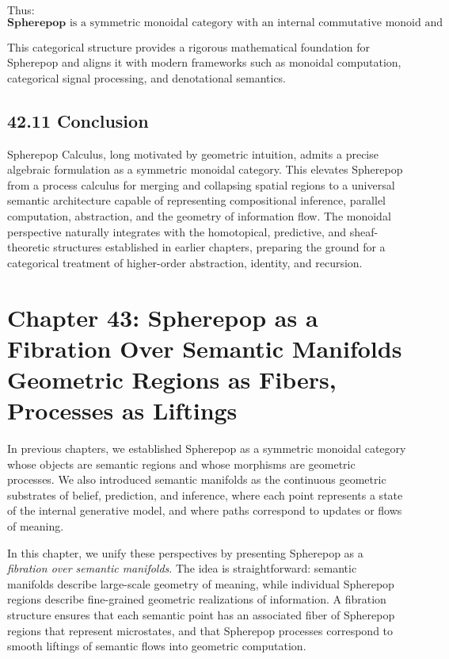 \documentclass[12pt,letterpaper]{article}
\theoremstyle{remark}
\begin{document}
Thus:
\[
\boxed{
\mathbf{Spherepop} \text{ is a symmetric monoidal category with an internal commutative monoid and collapse homomorphisms.}
}
\]

This categorical structure provides a rigorous mathematical foundation for Spherepop and aligns it with modern frameworks such as monoidal computation, categorical signal processing, and denotational semantics.

\subsection{42.11 Conclusion}

Spherepop Calculus, long motivated by geometric intuition, admits a precise algebraic formulation as a symmetric monoidal category. This elevates Spherepop from a process calculus for merging and collapsing spatial regions to a universal semantic architecture capable of representing compositional inference, parallel computation, abstraction, and the geometry of information flow. The monoidal perspective naturally integrates with the homotopical, predictive, and sheaf-theoretic structures established in earlier chapters, preparing the ground for a categorical treatment of higher-order abstraction, identity, and recursion.

\newpage

\section{Chapter 43: Spherepop as a Fibration Over Semantic Manifolds  
Geometric Regions as Fibers, Processes as Liftings}

In previous chapters, we established Spherepop as a symmetric monoidal category whose objects are semantic regions and whose morphisms are geometric processes. We also introduced semantic manifolds as the continuous geometric substrates of belief, prediction, and inference, where each point represents a state of the internal generative model, and where paths correspond to updates or flows of meaning.

In this chapter, we unify these perspectives by presenting Spherepop as a \emph{fibration over semantic manifolds}. The idea is straightforward: semantic manifolds describe large-scale geometry of meaning, while individual Spherepop regions describe fine-grained geometric realizations of information. A fibration structure ensures that each semantic point has an associated fiber of Spherepop regions that represent microstates, and that Spherepop processes correspond to smooth liftings of semantic flows into geometric computation.
\end{document}
